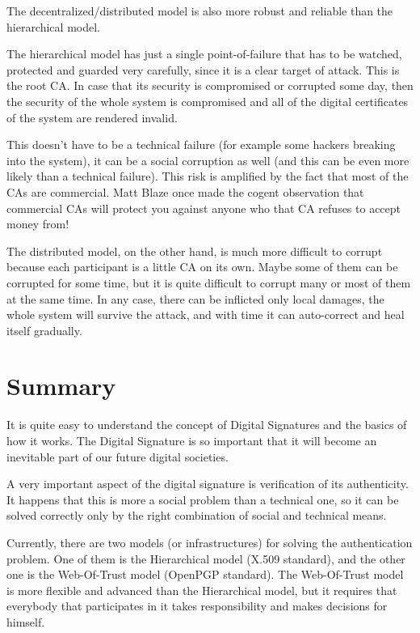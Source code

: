 \documentclass[a4paper]{article}
\begin{document}
The decentralized/distributed model is also more robust and reliable
than the hierarchical model.

The hierarchical model has just a single point-of-failure that has to
be watched, protected and guarded very carefully, since it is a clear
target of attack. This is the root CA. In case that its security is
compromised or corrupted some day, then the security of the whole
system is compromised and all of the digital certificates of the
system are rendered invalid.

This doesn't have to be a technical failure (for example some hackers
breaking into the system), it can be a social corruption as well (and
this can be even more likely than a technical failure). This risk is
amplified by the fact that most of the CAs are commercial. Matt Blaze
once made the cogent observation that commercial CAs will protect you
against anyone who that CA refuses to accept money from!

The distributed model, on the other hand, is much more difficult to
corrupt because each participant is a little CA on its own. Maybe some
of them can be corrupted for some time, but it is quite difficult to
corrupt many or most of them at the same time. In any case, there can
be inflicted only local damages, the whole system will survive the
attack, and with time it can auto-correct and heal itself gradually.


\section{Summary}

It is quite easy to understand the concept of Digital Signatures and
the basics of how it works. The Digital Signature is so important that
it will become an inevitable part of our future digital societies.

A very important aspect of the digital signature is verification of
its authenticity. It happens that this is more a social problem than a
technical one, so it can be solved correctly only by the right
combination of social and technical means.

Currently, there are two models (or infrastructures) for solving the
authentication problem. One of them is the Hierarchical model (X.509
standard), and the other one is the Web-Of-Trust model (OpenPGP
standard). The Web-Of-Trust model is more flexible and advanced than
the Hierarchical model, but it requires that everybody that
participates in it takes responsibility and makes decisions for
himself.
\end{document}
